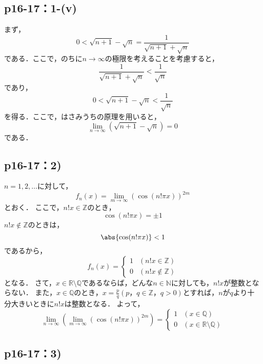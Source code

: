 \documentclass[uplatex,dvipdfmx,a4paper,10pt,fleqn]{jsarticle}
\begin{document}
\subsection*{p16-17：1-(v)}
\begin{tleftbar}
    まず，
    \[
       0<\sqrt{n+1} - \sqrt{n} = \frac{1}{\sqrt{n+1} + \sqrt{n}}
    \]
    である．ここで，のちに$n \to \infty$の極限を考えることを考慮すると，
    \[
    \frac{1}{\sqrt{n+1} + \sqrt{n}} < \frac{1}{\sqrt{n}} 
    \]
    であり，
    \[
        0< \sqrt{n+1} - \sqrt{n} <\frac{1}{\sqrt{n}}
    \]
    を得る．ここで，はさみうちの原理を用いると，
    \[
        \lim_{n \to \infty} (\sqrt{n+1} - \sqrt{n} )=0
    \]
    である．
\end{tleftbar}

\subsection*{p16-17：2)}

$n=1,2,\ldots$に対して，
\[
	f_{n} (x)=\lim_{m \to \infty} (\cos (n! \pi x)) ^{2m}
\]
とおく．
ここで，$n!x \in \mathbb{Z}$のとき，
\[
	\cos (n! \pi x)=\pm 1
\]
$n!x \notin \mathbb{Z}$のときは，
\[
	\abs{\cos (n! \pi x)}<1
\]
であるから，
\[
	f_{n} (x)=
	\begin{cases}
		1 &(n!x \in \mathbb{Z}) \\
		0 & (n!x \notin \mathbb{Z})
	\end{cases}
\]
となる．
さて，$x \in \mathbb{R} \setminus \mathbb{Q}$であるならば，どんな$n \in \mathbb{N}$に対しても，$n! x$が整数とならない．
また，$x \in \mathbb{Q}$のとき，$ x=\frac{p}{q}(p，q \in \mathbb{Z}，q>0)$とすれば，$n$が$q$より十分大きいときに$n!x$は整数となる．
よって，
\[
	\lim_{n \to \infty} \left( \lim_{m \to \infty} (\cos (n! \pi x)) ^{2m} \right)=
	\begin{cases}
		1 &(x \in \mathbb{Q}) \\
		0 & (x \in \mathbb{R} \setminus \mathbb{Q})
	\end{cases}
\]


\subsection*{p16-17：3)}

\end{document}
